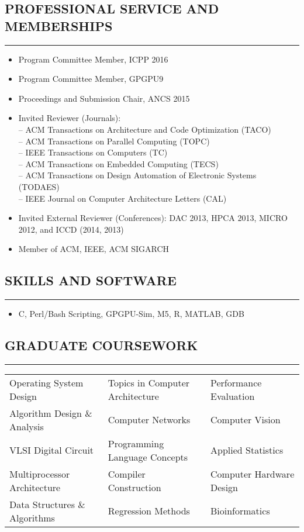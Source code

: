 \documentclass[10pt,a4]{article}
\begin{document}
\subsection*{PROFESSIONAL SERVICE AND MEMBERSHIPS}
\hrule
\vspace{0.2cm}
\begin{itemize}
	\item Program Committee Member, ICPP 2016
	\item Program Committee Member, GPGPU9
	\item Proceedings and Submission Chair, ANCS 2015
	\item Invited Reviewer (Journals):  \\
	-- ACM Transactions on Architecture and Code Optimization (TACO) \\
	-- ACM Transactions on Parallel Computing (TOPC) \\
	-- IEEE Transactions on Computers (TC) \\ 
	-- ACM Transactions on Embedded Computing (TECS) \\
	-- ACM Transactions on Design Automation of Electronic Systems (TODAES) \\
	-- IEEE Journal on Computer Architecture Letters (CAL)
	\item Invited External Reviewer (Conferences):
	DAC 2013, HPCA 2013, MICRO 2012, and ICCD (2014, 2013)
	\item Member of ACM, IEEE, ACM SIGARCH
\end{itemize}

\subsection*{SKILLS AND SOFTWARE}
\hrule
\vspace{0.2cm}
\begin{itemize}
\item C, Perl/Bash Scripting, GPGPU-Sim, M5, R, MATLAB, GDB
\end{itemize}

\subsection*{GRADUATE COURSEWORK}
\hrule
\vspace{0.2cm}
\begin{tabular}{@{}l || l || l} 
Operating System Design & Topics in Computer Architecture & Performance Evaluation\\
Algorithm Design \& Analysis  & Computer Networks & Computer Vision \\
VLSI Digital Circuit & Programming Language Concepts &   Applied Statistics  \\
Multiprocessor Architecture & Compiler Construction &  Computer Hardware Design \\
Data Structures \& Algorithms & Regression Methods & Bioinformatics 
\end{tabular}
\end{document}
